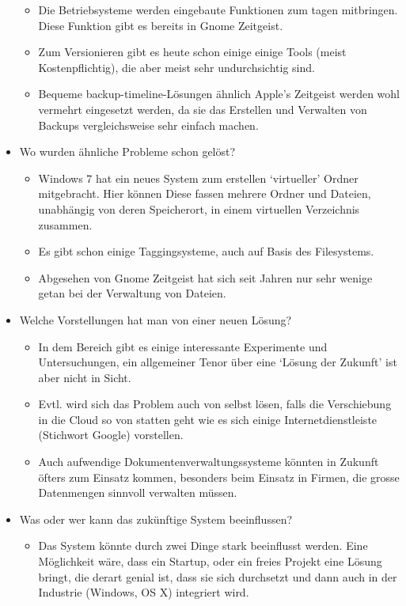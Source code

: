\documentclass[10pt,paper=a4,final]{scrartcl}
\begin{document}
\begin{itemize}
    \begin{itemize}
      \item Die Betriebsysteme werden eingebaute Funktionen zum tagen mitbringen. Diese Funktion gibt es bereits in Gnome Zeitgeist.
      \item Zum Versionieren gibt es heute schon einige einige Tools (meist Kostenpflichtig), die aber meist sehr undurchsichtig sind.
      \item Bequeme backup-timeline-Lösungen ähnlich Apple’s Zeitgeist werden wohl vermehrt eingesetzt werden, da sie das Erstellen und Verwalten von Backups vergleichsweise sehr einfach machen.
    \end{itemize}
  \item Wo wurden ähnliche Probleme schon gelöst?
    \begin{itemize}
      \item Windows 7 hat ein neues System zum erstellen ‘virtueller’ Ordner mitgebracht. Hier können Diese fassen mehrere Ordner und Dateien, unabhängig von deren Speicherort, in einem virtuellen Verzeichnis zusammen.
      \item Es gibt schon einige Taggingsysteme, auch auf Basis des Filesystems. 
      \item Abgesehen von Gnome Zeitgeist hat sich seit Jahren nur sehr wenige getan bei der Verwaltung von Dateien.
    \end{itemize}
  \item Welche Vorstellungen hat man von einer neuen Lösung?
    \begin{itemize}
      \item In dem Bereich gibt es einige interessante Experimente und Untersuchungen, ein allgemeiner Tenor über eine ‘Lösung der Zukunft’ ist aber nicht in Sicht.
      \item Evtl. wird sich das Problem auch von selbst lösen, falls die Verschiebung in die Cloud so von statten geht wie es sich einige Internetdienstleiste (Stichwort Google) vorstellen.
      \item Auch aufwendige Dokumentenverwaltungssysteme könnten in Zukunft öfters zum Einsatz kommen, besonders beim Einsatz in Firmen, die grosse Datenmengen sinnvoll verwalten müssen.
    \end{itemize}
  \item Was oder wer kann das zukünftige System beeinflussen?
    \begin{itemize}
      \item Das System könnte durch zwei Dinge stark beeinflusst werden. Eine Möglichkeit wäre, dass ein Startup, oder ein freies Projekt eine Lösung bringt, die derart genial ist, dass sie sich durchsetzt und dann auch in der Industrie (Windows, OS X) integriert wird.

\end{itemize}
\end{itemize}
\end{document}
